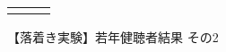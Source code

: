 \begin{figure}[h]
\begin{tabular}{ccc}
    \begin{minipage} {0.31\hsize}
    \centering
    \includegraphics [ width = 1\columnwidth]{Figure/Appendix/6C/Calm_YNH/Fig_YNH_MOF_cal-hap_Task1.eps }
    　
    \end{minipage} 



  \end{tabular}

  \vspace {-6pt}
  \caption{【落着き実験】若年健聴者結果 その2}


  \vspace {-12pt}
\end{figure}


\clearpage

